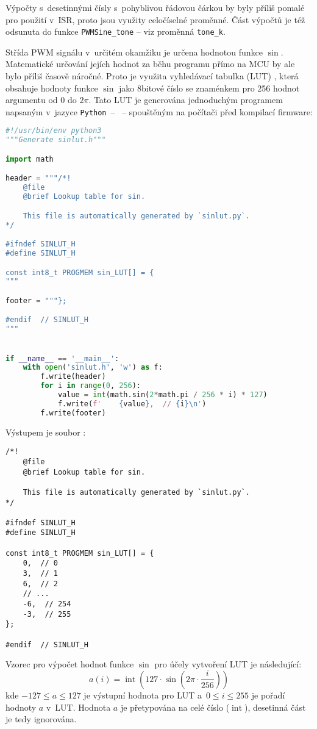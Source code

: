 Výpočty s~desetinnými čísly s~pohyblivou řádovou čárkou by byly příliš pomalé
pro použití v~ISR, proto jsou využity celočíselné proměnné. Část
výpočtů je též odsunuta do funkce \verb|PWMSine_tone| -- viz proměnná
\verb|tone_k|.

Střída PWM signálu v~určitém okamžiku je určena hodnotou funkce $\sin$.
Matematické určování jejích hodnot za běhu programu přímo na MCU by ale bylo
příliš časově náročné. Proto je využita vyhledávací tabulka (\acs{LUT})
, která obsahuje hodnoty funkce $\sin$ jako 8bitové číslo se
znaménkem pro 256 hodnot argumentu od $0$ do $2\pi$. Tato LUT je generována
jednoduchým programem napsaným v~jazyce \texttt{Python}~--
~-- spouštěným na počítači před kompilací firmware:
\begin{lstlisting}[language=Python,style=numbers]
#!/usr/bin/env python3
"""Generate sinlut.h"""

import math

header = """/*!
    @file
    @brief Lookup table for sin.

    This file is automatically generated by `sinlut.py`.
*/

#ifndef SINLUT_H
#define SINLUT_H

const int8_t PROGMEM sin_LUT[] = {
"""

footer = """};

#endif  // SINLUT_H
"""


if __name__ == '__main__':
    with open('sinlut.h', 'w') as f:
        f.write(header)
        for i in range(0, 256):
            value = int(math.sin(2*math.pi / 256 * i) * 127)
            f.write(f'    {value},  // {i}\n')
        f.write(footer)
\end{lstlisting}

Výstupem je soubor :
\begin{lstlisting}[language=myC++,style=numbers]
/*!
    @file
    @brief Lookup table for sin.

    This file is automatically generated by `sinlut.py`.
*/

#ifndef SINLUT_H
#define SINLUT_H

const int8_t PROGMEM sin_LUT[] = {
    0,  // 0
    3,  // 1
    6,  // 2
    // ...
    -6,  // 254
    -3,  // 255
};

#endif  // SINLUT_H
\end{lstlisting}

Vzorec pro výpočet hodnot funkce $\sin$ pro účely vytvoření LUT je následující:
\begin{equation}
    a(i) = \operatorname{int}\left( \num{127}\cdot\sin{\left(2\pi \cdot \frac{i}{256}\right)} \right)
\end{equation}
kde $\num{-127} \le a \le \num{127}$ je výstupní hodnota pro LUT
a~$\num{0} \le i \le \num{255}$ je pořadí hodnoty $a$ v~LUT. Hodnota $a$ je
přetypována na celé číslo ($\operatorname{int}$), desetinná část je tedy
ignorována.

